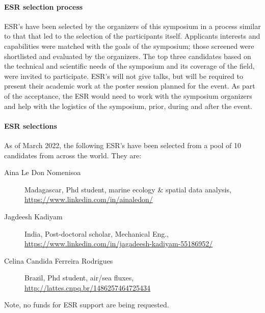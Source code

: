 \paragraph{ESR selection process} ESR's have been selected by the
organizers of this symposium in a process similar to that that led to
the selection of the participants itself. Applicants interests and
capabilities were matched with the goals of the symposium; those
screened were shortlisted and evaluated by the organizers. The top
three candidates based on the technical and scientific needs of the
symposium and its coverage of the field, were invited to
participate. ESR's will not give talks, but will be required to
present their academic work at the poster session planned for the
event.  As part of the acceptance, the ESR would need to work with the
symposium organizers and help with the logistics of the symposium,
prior, during and after the event.

\paragraph{ESR selections} As of March 2022, the following ESR's have
been selected from a pool of 10 candidates from across the world. They
are:

\begin{description}

  \item[Aina Le Don Nomenisoa] Madagascar, Phd student,
    marine ecology \& spatial data analysis, \url{https://www.linkedin.com/in/ainaledon/}

  \item[Jagdeesh Kadiyam] India, Post-doctoral scholar, Mechanical Eng., \url{https://www.linkedin.com/in/jagadeesh-kadiyam-55186952/}

  \item[Celina Candida Ferreira Rodrigues] Brazil, Phd student, air/sea fluxes, \url{http://lattes.cnpq.br/1486257464725434}

\end{description}  

Note, no funds for ESR support are being requested.

